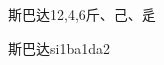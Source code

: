 \begin{entry}{斯巴达}{12,4,6}{⽄、⼰、⾡}
  \begin{phonetics}{斯巴达}{si1ba1da2}
  \end{phonetics}
\end{entry}
